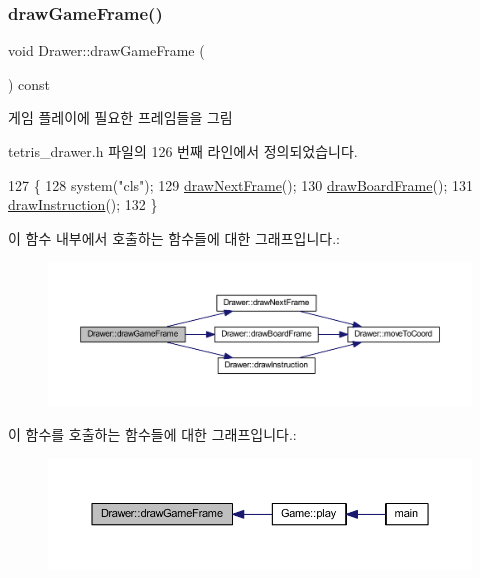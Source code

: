 \subsubsection{\texorpdfstring{draw\+Game\+Frame()}{drawGameFrame()}}
{\footnotesize\ttfamily void Drawer\+::draw\+Game\+Frame (\begin{DoxyParamCaption}{ }\end{DoxyParamCaption}) const\hspace{0.3cm}{\ttfamily [inline]}}



게임 플레이에 필요한 프레임들을 그림 



tetris\+\_\+drawer.\+h 파일의 126 번째 라인에서 정의되었습니다.


\begin{DoxyCode}
127     \{
128         system(\textcolor{stringliteral}{"cls"});
129         \mbox{\hyperlink{class_drawer_a2deae79fb268b41b72693d005cdf2178}{drawNextFrame}}();
130         \mbox{\hyperlink{class_drawer_a72d01f53fc2c5ff15763dcd76a9b9395}{drawBoardFrame}}();
131         \mbox{\hyperlink{class_drawer_a4fb74bcad295250c519bb848dd48b0de}{drawInstruction}}();
132     \}
\end{DoxyCode}
이 함수 내부에서 호출하는 함수들에 대한 그래프입니다.\+:
\nopagebreak
\begin{figure}[H]
\begin{center}
\leavevmode
\includegraphics[width=350pt]{class_drawer_a9f5e10f6175710be253244d6f80ebcf7_cgraph}
\end{center}
\end{figure}
이 함수를 호출하는 함수들에 대한 그래프입니다.\+:
\nopagebreak
\begin{figure}[H]
\begin{center}
\leavevmode
\includegraphics[width=350pt]{class_drawer_a9f5e10f6175710be253244d6f80ebcf7_icgraph}
\end{center}
\end{figure}
\mbox{\label{class_drawer_a57ec099eb46c93f20d9221a2244dd9a7}} 
